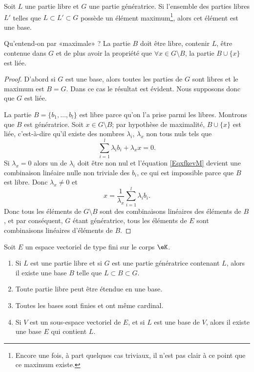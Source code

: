 \begin{lemma}   \label{LemkUfzHl}
	Soit \( L\) une partie libre et \( G\) une partie génératrice. Si l'ensemble des parties libres \( L'\) telles que \( L\subset L'\subset G\) possède un élément maximum\footnote{Encore une fois, à part quelques cas triviaux, il n'est pas clair à ce point que ce maximum existe.}, alors cet élément est une base.
\end{lemma}
Qu'entend-on par «maximale» ? La partie \( B\) doit être libre, contenir \( L\), être contenue dans \( G\) et de plus avoir la propriété que \( \forall x\in G\setminus B\), la partie \( B\cup\{ x \}\) est liée.

\begin{proof}
	D'abord si \( G\) est une base, alors toutes les parties de \( G\) sont libres et le maximum est \( B=G\). Dans ce cas le résultat est évident. Nous supposons donc que \( G\) est liée.

	La partie \( B=\{ b_1,\ldots, b_l \}\) est libre parce qu'on l'a prise parmi les libres. Montrons que \( B\) est génératrice. Soit \( x\in G\setminus B\); par hypothèse de maximalité, \( B\cup\{ x \}\) est liée, c'est-à-dire qu'il existe des nombres \( \lambda_i\), \( \lambda_x\) non tous nuls tels que
	\begin{equation}    \label{EqxfkevM}
		\sum_{i=1}^l\lambda_ib_i+\lambda_xx=0.
	\end{equation}
	Si \( \lambda_x=0\) alors un de \( \lambda_i\) doit être non nul et l'équation \eqref{EqxfkevM} devient une combinaison linéaire nulle non triviale des \( b_i\), ce qui est impossible parce que \( B\) est libre. Donc \( \lambda_x\neq 0\) et
	\begin{equation}
		x=\frac{1}{ \lambda_x }\sum_{i=1}^l\lambda_ib_i.
	\end{equation}
	Donc tous les éléments de \( G\setminus B\) sont des combinaisons linéaires des éléments de \( B\), et par conséquent, \( G\) étant génératrice, tous les éléments de \( E\) sont combinaisons linéaires d'éléments de \( B\).
\end{proof}

\begin{theorem} \label{ThonmnWKs}
	Soit \( E\) un espace vectoriel de type fini sur le corps \( \eK\).
	\begin{enumerate}
		\item     \label{ItemBazxTZ}
		      Si \( L\) est une partie libre et si \( G\) est une partie génératrice contenant \( L\), alors il existe une base \( B\) telle que \( L\subset B\subset G\).
		\item     \label{ITEMooFVJXooGzzpOu}
		      Toute partie libre peut être étendue en une base.
		\item     \label{ITEMooFBUAooSSZxgx}
		      Toutes les bases sont finies et ont même cardinal.
		\item       \label{ITEMooJIJSooGuJMdt}
		      Si \( V\) est un sous-espace vectoriel de \( E\), et si \( L\) est une base de \( V\), alors il existe une base \( E\) qui contient \( L\).
	\end{enumerate}
\end{theorem}

